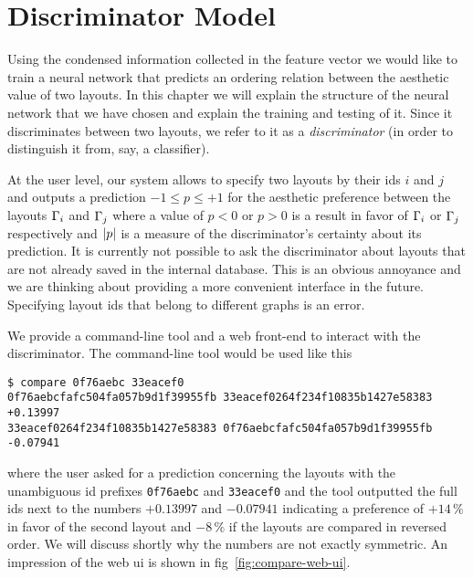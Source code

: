 \documentclass{graphstudy}
\begin{document}
\chapter{Discriminator Model}
\label{chap:dismod}

Using the condensed information collected in the feature vector we would like to train a neural network that predicts an
ordering relation between the aesthetic value of two layouts.  In this chapter we will explain the structure of the
neural network that we have chosen and explain the training and testing of it.  Since it discriminates between two
layouts, we refer to it as a \emph{discriminator} (in order to distinguish it from, say, a classifier).

At the user level, our system allows to specify two layouts by their \acsp{id} \(i\) and \(j\) and outputs a prediction
\(-1\leq{p}\leq+1\) for the aesthetic preference between the layouts \(\Gamma_i\) and \(\Gamma_j\) where a value of
\(p<0\) or \(p>0\) is a result in favor of \(\Gamma_i\) or \(\Gamma_j\) respectively and \(\left\lvert p\right\rvert\) is a measure of
the discriminator's certainty about its prediction.  It is currently not possible to ask the discriminator about layouts
that are not already saved in the internal database.  This is an obvious annoyance and we are thinking about providing a
more convenient interface in the future.  Specifying layout \acsp{id} that belong to different graphs is an error.

We provide a command-line tool and a web front-end to interact with the discriminator.  The command-line tool would be
used like this
\begin{lstlisting}
$ compare 0f76aebc 33eacef0
0f76aebcfafc504fa057b9d1f39955fb 33eacef0264f234f10835b1427e58383   +0.13997
33eacef0264f234f10835b1427e58383 0f76aebcfafc504fa057b9d1f39955fb   -0.07941
\end{lstlisting}
where the user asked for a prediction concerning the layouts with the unambiguous \acs{id} prefixes \verb`0f76aebc` and
\verb`33eacef0` and the tool outputted the full \acsp{id} next to the numbers \(+0.13997\) and \(-0.07941\) indicating a
preference of \(+14\,\%\) in favor of the second layout and \(-8\,\%\) if the layouts are compared in reversed order.
We will discuss shortly why the numbers are not exactly symmetric.  An impression of the web \acs{ui} is shown in
\acl{fig}~\ref{fig:compare-web-ui}.
\end{document}
